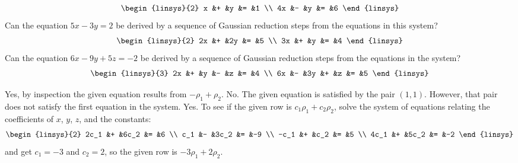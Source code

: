 \begin{exercises}
\begin{exparts}
\begin{equation*}
\begin{linsys}{2}
             x  &+  &y  &=  &1  \\
            4x  &-  &y  &=  &6
          \end{linsys}
        \end{equation*}
      \partsitem Can the equation \( 5x-3y=2 \) be derived by a sequence of
        Gaussian reduction steps from the equations in this system?
        \begin{equation*}
          \begin{linsys}{2}
            2x  &+  &2y &=  &5  \\
            3x  &+  &y  &=  &4
          \end{linsys}
        \end{equation*}
      \partsitem Can the equation \( 6x-9y+5z=-2 \) be derived 
        by a sequence of
        Gaussian reduction steps from the equations in the system?
        \begin{equation*}
          \begin{linsys}{3}
            2x  &+  &y  &-  &z  &=  &4  \\
            6x  &-  &3y &+  &z  &=  &5
          \end{linsys}
        \end{equation*}
    \end{exparts}
    \begin{answer} 
       \begin{exparts} 
        \partsitem Yes, by inspection the given equation results from
          \( -\rho_1+\rho_2 \).
        \partsitem No.
          The given equation is satisfied by the pair \( (1,1) \). 
          However, that pair 
          does not satisfy the first equation in the system.
        \partsitem Yes.
          To see if the given row is \( c_1\rho_1+c_2\rho_2 \), solve
          the system of equations relating the coefficients of $x$, $y$,
          $z$, and the constants:
          \begin{equation*}
            \begin{linsys}{2}
               2c_1  &+  &6c_2  &=  &6  \\
                c_1  &-  &3c_2  &=  &-9 \\
               -c_1  &+  &c_2   &=  &5  \\
               4c_1  &+  &5c_2  &=  &-2 
            \end{linsys}
          \end{equation*}
          and get $c_1=-3$ and $c_2=2$, so the given row is
          \( -3\rho_1+2\rho_2 \).

\end{exparts}
\end{answer}
\end{exercises}
